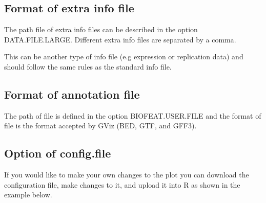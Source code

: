 \documentclass[11pt]{article}\usepackage[]{graphicx}\usepackage[usenames,dvipsnames]{color}
\begin{document}
\subsection{Format of extra info file}
The path file of extra info files can be described in the option DATA.FILE.LARGE. Different extra info files are separated by a comma.

This can be another type of info file (e.g expression or replication data) and should follow the same rules as the standard info file.

\subsection{Format of annotation file}
The path of file is defined in the option BIOFEAT.USER.FILE and the format of file is the format accepted by GViz (BED, GTF, and GFF3).

\subsection{Option of config.file}

If you would like to make your own changes to the plot you can download the configuration file, make
changes to it, and upload it into R as shown in the example below.
\end{document}
